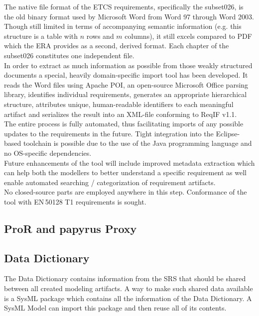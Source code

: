 \documentclass{template/openetcs_report}
\begin{document}
The native file format of the ETCS requirements, specifically the subset026, is the old binary format used by Microsoft Word from Word 97 through Word 2003. Though still limited in terms of accompanying semantic information (e.g. this structure is a table with $n$ rows and $m$ columns), it still excels compared to PDF which the ERA provides as a second, derived format. Each chapter of the subset026 constitutes one independent file.\\
In order to extract as much information as possible from those weakly structured documents a special, heavily domain-specific import tool has been developed. It reads the Word files using Apache POI, an open-source Microsoft Office parsing library, identifies individual requirements, generates an appropriate hierarchical structure, attributes unique, human-readable identifiers to each meaningful artifact and serializes the result into an XML-file conforming to ReqIF v1.1.\\
The entire process is fully automated, thus facilitating imports of any possible updates to the requirements in the future. Tight integration into the Eclipse-based toolchain is possible due to the use of the Java programming language and no OS-specific dependencies.\\
Future enhancements of the tool will include improved metadata extraction which can help both the modellers to better understand a specific requirement as well enable automated searching / categorization of requirement artifacts.\\
No closed-source parts are employed anywhere in this step. Conformance of the tool with EN\,50128 T1 requirements is sought.

    \subsection{ProR and papyrus Proxy}
    \subsection{Data Dictionary}

    The Data Dictionary contains information from the SRS that should
    be shared between all created modeling artifacts. A way to make
    such shared data available is a SysML package which contains all
    the information of the Data Dictionary. A SysML Model can import
    this package and then reuse all of its contents.
\end{document}

